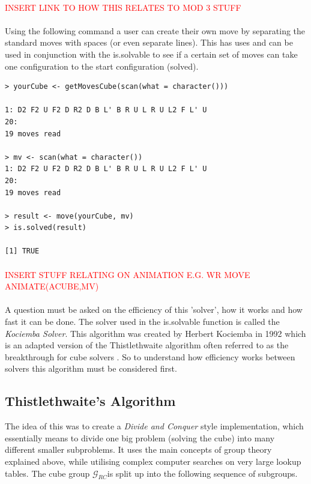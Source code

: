 \documentclass{article}
\begin{document}
\paragraph*{}
\textcolor{red}{INSERT LINK TO HOW THIS RELATES TO MOD 3 STUFF}
\paragraph*{}
Using the following command a user can create their own move by separating the standard moves with spaces (or even separate lines). This has uses and can be used in conjunction with the is.solvable to see if a certain set of moves can take one configuration to the start configuration (solved).
\begin{lstlisting}
> yourCube <- getMovesCube(scan(what = character()))

1: D2 F2 U F2 D R2 D B L' B R U L R U L2 F L' U
20:
19 moves read

> mv <- scan(what = character())
1: D2 F2 U F2 D R2 D B L' B R U L R U L2 F L' U
20:
19 moves read

> result <- move(yourCube, mv)
> is.solved(result)

[1] TRUE
\end{lstlisting}
\paragraph*{}
\textcolor{red}{INSERT STUFF RELATING ON ANIMATION E.G. WR MOVE ANIMATE(ACUBE,MV)}
\paragraph*{}

A question must be asked on the efficiency of this 'solver', how it works and how fast it can be done. 
The solver used in the is.solvable function is called the \textit{Kociemba Solver}. This algorithm was created by Herbert Kociemba in 1992 which is an adapted version of the Thistlethwaite algorithm often referred to as the breakthrough for cube solvers\cite{Thistlethwaite}
. So to understand how efficiency works between solvers this algorithm must be considered first.

\subsection{Thistlethwaite's Algorithm}

The idea of this was to create a \textit{Divide and Conquer} style implementation, which essentially means to divide one big problem (solving the cube) into many different smaller subproblems. It uses the main concepts of group theory explained above, while utilising complex computer searches on very large lookup tables. 
The cube group $\mathcal{G}_{RC}$is split up into the following sequence of subgroups.  
\end{document}

